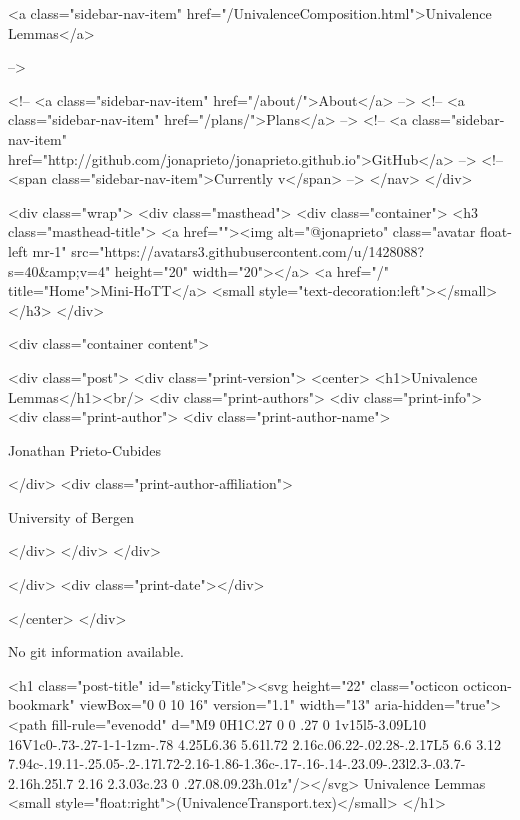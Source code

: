       
    
      
        
          <a class="sidebar-nav-item" href="/UnivalenceComposition.html">Univalence Lemmas</a>
        
      
     -->

    <!-- <a class="sidebar-nav-item" href="/about/">About</a> -->
    <!-- <a class="sidebar-nav-item" href="/plans/">Plans</a> -->
    <!-- <a class="sidebar-nav-item" href="http://github.com/jonaprieto/jonaprieto.github.io">GitHub</a> -->
    <!-- <span class="sidebar-nav-item">Currently v</span> -->
  </nav>
</div>

    <div class="wrap">
      <div class="masthead">
        <div class="container">
          <h3 class="masthead-title">
            <a href=""><img alt="@jonaprieto" class="avatar float-left mr-1" src="https://avatars3.githubusercontent.com/u/1428088?s=40&amp;v=4" height="20" width="20"></a>
            <a href="/" title="Home">Mini-HoTT</a>
            <small style="text-decoration:left"></small>
          </h3>
        </div>
      
      <div class="container content">
        







<div class="post">
  <div class="print-version">
    <center>
      <h1>Univalence Lemmas</h1><br/>
        <div class="print-authors">
          <div class="print-info">
            <div class="print-author">
              <div class="print-author-name">
                
                  Jonathan Prieto-Cubides
                
              </div>
              <div class="print-author-affiliation">
                
                  University of Bergen
                
                </div>
            </div>
          </div>
          
          
        </div>
        <div class="print-date"></div>
        
        
    </center>
  </div>

  
  No git information available.
  

  <h1 class="post-title" id="stickyTitle"><svg height="22" class="octicon octicon-bookmark" viewBox="0 0 10 16" version="1.1" width="13" aria-hidden="true"><path fill-rule="evenodd" d="M9 0H1C.27 0 0 .27 0 1v15l5-3.09L10 16V1c0-.73-.27-1-1-1zm-.78 4.25L6.36 5.61l.72 2.16c.06.22-.02.28-.2.17L5 6.6 3.12 7.94c-.19.11-.25.05-.2-.17l.72-2.16-1.86-1.36c-.17-.16-.14-.23.09-.23l2.3-.03.7-2.16h.25l.7 2.16 2.3.03c.23 0 .27.08.09.23h.01z"/></svg> Univalence Lemmas <small style="float:right">(UnivalenceTransport.tex)</small>
  </h1>

